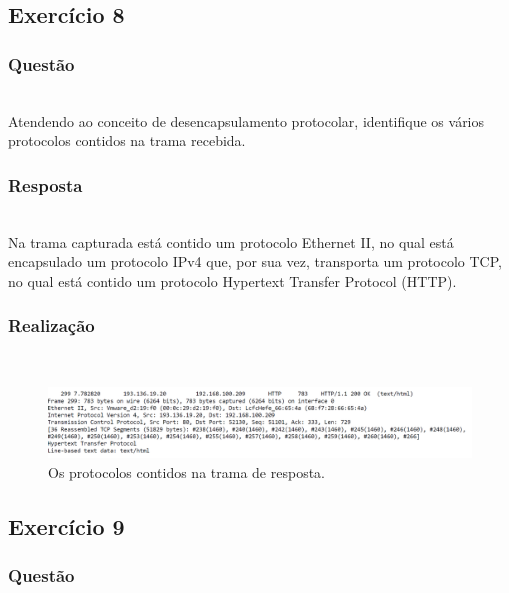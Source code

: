 \documentclass{llncs}
\begin{document}
\clearpage
\subsection{Exercício 8}
\subsubsection{Questão}\rule[-10pt]{0pt}{10pt}\\

Atendendo ao conceito de desencapsulamento protocolar, identifique os vários protocolos contidos na trama recebida.

\subsubsection{Resposta}\rule[-10pt]{0pt}{10pt}\\

Na trama capturada está contido um protocolo Ethernet II, no qual está encapsulado um protocolo IPv4 que, por sua vez, transporta um protocolo TCP, no qual está contido um protocolo Hypertext Transfer Protocol (HTTP).

\subsubsection{Realização}\rule[-10pt]{0pt}{10pt}\\

\begin{figure}
  \begin{center}
  \includegraphics[scale=0.35]{imagens/fields.png} 
  \end{center}
  \caption{Os protocolos contidos na trama de resposta.}
  \label{fig:response_fields}
\end{figure}


\clearpage
\subsection{Exercício 9}
\subsubsection{Questão}\rule[-10pt]{0pt}{10pt}\\
\end{document}
